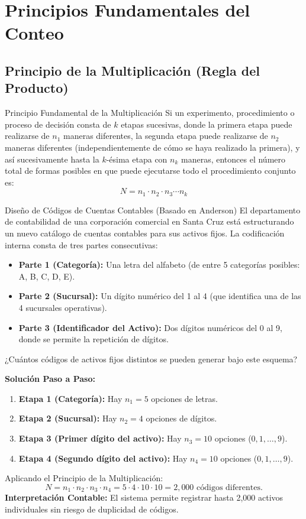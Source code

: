 \section{Principios Fundamentales del Conteo}

\subsection{Principio de la Multiplicación (Regla del Producto)}
\begin{definicion}{Principio Fundamental de la Multiplicación}
Si un experimento, procedimiento o proceso de decisión consta de $k$ etapas sucesivas, donde la primera etapa puede realizarse de $n_1$ maneras diferentes, la segunda etapa puede realizarse de $n_2$ maneras diferentes (independientemente de cómo se haya realizado la primera), y así sucesivamente hasta la $k$-ésima etapa con $n_k$ maneras, entonces el número total de formas posibles en que puede ejecutarse todo el procedimiento conjunto es:
\begin{equation}
    N = n_1 \cdot n_2 \cdot n_3 \dotsm n_k
\end{equation}
\end{definicion}

\begin{ejemplo}{Diseño de Códigos de Cuentas Contables (Basado en Anderson)}
El departamento de contabilidad de una corporación comercial en Santa Cruz está estructurando un nuevo catálogo de cuentas contables para sus activos fijos. La codificación interna consta de tres partes consecutivas:
\begin{itemize}
    \item \textbf{Parte 1 (Categoría):} Una letra del alfabeto (de entre 5 categorías posibles: A, B, C, D, E).
    \item \textbf{Parte 2 (Sucursal):} Un dígito numérico del 1 al 4 (que identifica una de las 4 sucursales operativas).
    \item \textbf{Parte 3 (Identificador del Activo):} Dos dígitos numéricos del 0 al 9, donde se permite la repetición de dígitos.
\end{itemize}
¿Cuántos códigos de activos fijos distintos se pueden generar bajo este esquema?

\tcbline
\textbf{Solución Paso a Paso:}
\begin{enumerate}
    \item \textbf{Etapa 1 (Categoría):} Hay $n_1 = 5$ opciones de letras.
    \item \textbf{Etapa 2 (Sucursal):} Hay $n_2 = 4$ opciones de dígitos.
    \item \textbf{Etapa 3 (Primer dígito del activo):} Hay $n_3 = 10$ opciones ($0, 1, \dots, 9$).
    \item \textbf{Etapa 4 (Segundo dígito del activo):} Hay $n_4 = 10$ opciones ($0, 1, \dots, 9$).
\end{enumerate}
Aplicando el Principio de la Multiplicación:
\[
N = n_1 \cdot n_2 \cdot n_3 \cdot n_4 = 5 \cdot 4 \cdot 10 \cdot 10 = 2{,}000 \text{ códigos diferentes.}
\]
\textbf{Interpretación Contable:} El sistema permite registrar hasta 2,000 activos individuales sin riesgo de duplicidad de códigos.
\end{ejemplo}

